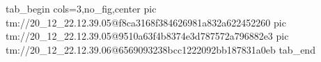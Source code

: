  
 
 
 
 

\qqSecOrig


\ifcmt
  tab_begin cols=3,no_fig,center
    pic tm://20_12_22.12.39.05@f8ca3168f384626981a832a622452260
    pic tm://20_12_22.12.39.05@9510a63f4b8374e3d787572a796882e3
    pic tm://20_12_22.12.39.06@6569093238bcc1222092bb187831a0eb
  tab_end
\fi

